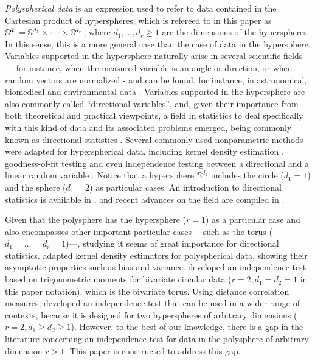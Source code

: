 \documentclass[oneside,11pt]{article}
\begin{document}
\textit{Polyspherical data} is an expression used to refer to data contained in the Cartesian product of hyperspheres, which is refereed to in this paper as $\mathbb{S}^{\boldsymbol{d}} := \mathbb{S}^{d_1} \times \dots \times \mathbb{S}^{d_r}$, where $d_1,\ldots,d_r\geq 1$ are the dimensions of the hyperspheres. In this sense, this is a more general case than the case of data in the hypersphere. Variables supported in the hypersphere naturally arise in several scientific fields --- for instance, when the measured variable is an angle or direction, or when random vectors are normalized - and can be found, for instance, in astronomical, biomedical and environmental data \citep[e.g.,][]{Garcia-Portugues2013, Carnicero2013, Fernandez-Duran2007, Garcia-Portugues2013a}. Variables supported in the hypersphere are also commonly called ``directional variables'', and, given their importance from both theoretical and practical viewpoints, a field in statistics to deal specifically with this kind of data and its associated problems emerged, being commonly known as directional statistics \citep{Mardia1999a}. Several commonly used nonparametric methods were adapted for hyperspherical data, including kernel density estimation \citep{Hall1987, Bai1988}, goodness-of-fit testing \citep{Garcia-Portugues2015} and even independence testing between a directional and a linear random variable \citep{Garcia-Portugues2015}. Notice that a hypersphere $\mathbb{S}^{d_1}$ includes the circle ($d_1 = 1$) and the sphere ($d_1 = 2$) as particular cases. An introduction to directional statistics is available in \cite{Mardia1999a}, and recent advances on the field are compiled in \cite{Pewsey2021}.

Given that the polysphere has the hypersphere ($r=1$) as a particular case and also encompasses other important particular cases ---such as the torus ($d_1 = \ldots = d_r = 1$)---, studying it seems of great importance for directional statistics. \cite{Garcia-Portugues2024} adapted kernel density estimators for polyspherical data, showing their asymptotic properties such as bias and variance. \cite{Garcia-Portugues2024b} developed an independence test based on trigonometric moments for bivariate circular data ($r=2, d_1 = d_2 = 1$ in this paper notation), which is the bivariate torus. Using distance correlation measures, \cite{cuparic2024} developed an independence test that can be used in a wider range of contexts, because it is designed for two hyperspheres of arbitrary dimensions ($r=2, d_1 \ge d_2 \ge 1$). However, to the best of our knowledge, there is a gap in the literature concerning an independence test for data in the polysphere of arbitrary dimension $r > 1$. This paper is constructed to address this gap.
\end{document}
